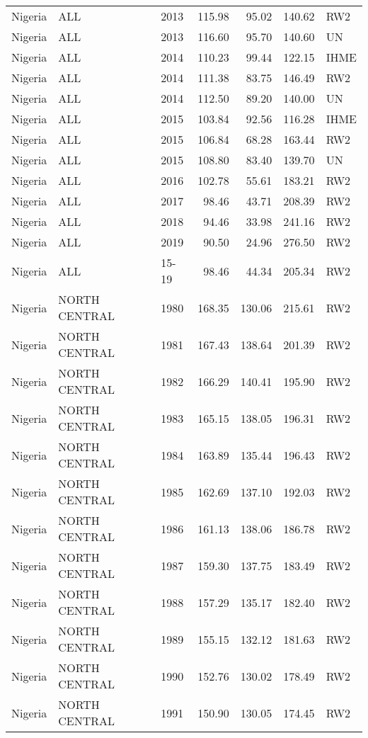\begin{longtable}{lllrrrl}
  Nigeria & ALL & 2013 & 115.98 & 95.02 & 140.62 & RW2 \\ 
  Nigeria & ALL & 2013 & 116.60 & 95.70 & 140.60 & UN \\ 
  Nigeria & ALL & 2014 & 110.23 & 99.44 & 122.15 & IHME \\ 
  Nigeria & ALL & 2014 & 111.38 & 83.75 & 146.49 & RW2 \\ 
  Nigeria & ALL & 2014 & 112.50 & 89.20 & 140.00 & UN \\ 
  Nigeria & ALL & 2015 & 103.84 & 92.56 & 116.28 & IHME \\ 
  Nigeria & ALL & 2015 & 106.84 & 68.28 & 163.44 & RW2 \\ 
  Nigeria & ALL & 2015 & 108.80 & 83.40 & 139.70 & UN \\ 
  Nigeria & ALL & 2016 & 102.78 & 55.61 & 183.21 & RW2 \\ 
  Nigeria & ALL & 2017 & 98.46 & 43.71 & 208.39 & RW2 \\ 
  Nigeria & ALL & 2018 & 94.46 & 33.98 & 241.16 & RW2 \\ 
  Nigeria & ALL & 2019 & 90.50 & 24.96 & 276.50 & RW2 \\ 
  Nigeria & ALL & 15-19 & 98.46 & 44.34 & 205.34 & RW2 \\ 
  Nigeria & NORTH CENTRAL & 1980 & 168.35 & 130.06 & 215.61 & RW2 \\ 
  Nigeria & NORTH CENTRAL & 1981 & 167.43 & 138.64 & 201.39 & RW2 \\ 
  Nigeria & NORTH CENTRAL & 1982 & 166.29 & 140.41 & 195.90 & RW2 \\ 
  Nigeria & NORTH CENTRAL & 1983 & 165.15 & 138.05 & 196.31 & RW2 \\ 
  Nigeria & NORTH CENTRAL & 1984 & 163.89 & 135.44 & 196.43 & RW2 \\ 
  Nigeria & NORTH CENTRAL & 1985 & 162.69 & 137.10 & 192.03 & RW2 \\ 
  Nigeria & NORTH CENTRAL & 1986 & 161.13 & 138.06 & 186.78 & RW2 \\ 
  Nigeria & NORTH CENTRAL & 1987 & 159.30 & 137.75 & 183.49 & RW2 \\ 
  Nigeria & NORTH CENTRAL & 1988 & 157.29 & 135.17 & 182.40 & RW2 \\ 
  Nigeria & NORTH CENTRAL & 1989 & 155.15 & 132.12 & 181.63 & RW2 \\ 
  Nigeria & NORTH CENTRAL & 1990 & 152.76 & 130.02 & 178.49 & RW2 \\ 
  Nigeria & NORTH CENTRAL & 1991 & 150.90 & 130.05 & 174.45 & RW2 \\ 

\end{longtable}
